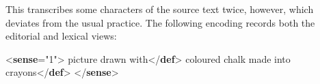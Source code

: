 This transcribes some characters of the source text twice, however, which deviates from the usual practice. The following encoding records both the editorial and lexical views:\par\bgroup{}\exampleFont \begin{shaded}\noindent\mbox{}{<\textbf{sense}\hspace*{1em}{n}="{1}">}\mbox{}\newline 
{}picture drawn\mbox{}\newline 
\hspace*{1em}\hspace*{1em} with{</\textbf{def}>}\mbox{}\newline 
{}coloured chalk made into\mbox{}\newline 
\hspace*{1em}\hspace*{1em} crayons{</\textbf{def}>}\mbox{}\newline 
{</\textbf{sense}>}\end{shaded}\egroup\par 
